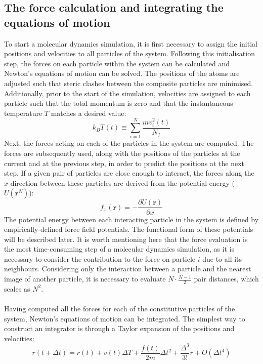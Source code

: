 \subsection{The force calculation and integrating the equations of motion}
To start a molecular dynamics simulation, it is first necessary to assign the initial positions and velocities to all particles of the system. Following this initialisation step, the forces on each particle within the system can be calculated and Newton's equations of motion can be solved.  The positions of the atoms are adjusted such that steric clashes between the composite particles are minimised. Additionally, prior to the start of the simulation, velocities are assigned to each particle such that the total momentum is zero and that the instantaneous temperature $T$ matches a desired value:
%
%
\begin{equation}
k_{B}T(t) \equiv \sum^{N}_{i=1} \frac{mv^{2}_{i}(t)}{N_{f}}
\end{equation}
%
%
Next, the forces acting on each of the particles in the system are computed. The forces are subsequently used, along with the positions of the particles at the current and at the previous step, in order to predict the positions at the next step. If a given pair of particles are close enough to interact, the forces along the $x$-direction between these particles are derived from the potential energy ($U(\mathbf{r}^{N})$):
%
%
\begin{equation}
f_{x}(\mathbf{r}) = -\frac{\partial U(\mathbf{r})}{\partial x}
\label{equ:force_calc}
\end{equation}
%
%
The potential energy between each interacting particle in the system is defined by empirically-defined force field potentials. The functional form of these potentials will be described later. It is worth mentioning here that the force evaluation is the most time-consuming step of a molecular dynamics simulation, as it is necessary to consider the contribution to the force on particle $i$ due to all its neighbours. Considering only the interaction between a particle and the nearest image of another particle, it is necessary to evaluate $N \cdot \frac{N-1}{2}$ pair distances, which scales as $N^{2}$. 
%
%
\\\\
%
%
Having computed all the forces for each of the constitutive particles of the system, Newton's equations of motion can be integrated. The simplest way to construct an integrator is through a Taylor expansion of the positions and velocities:
%
%
\begin{equation}
r(t + \Delta t) = r(t) + v(t) \Delta T + \frac{f(t)}{2m} \Delta t^{2} + \frac{\Delta^{3}}{3!} \dddot{r} + O(\Delta t^{4}) 
\end{equation}

